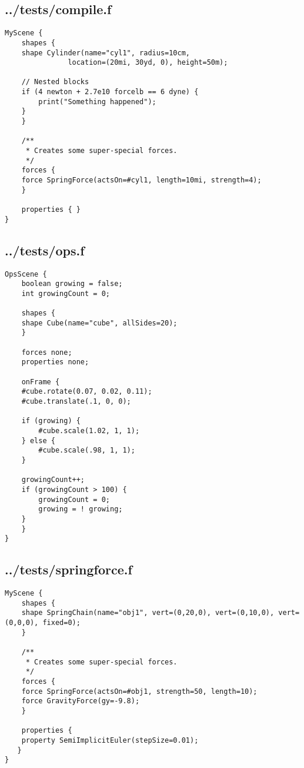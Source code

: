 \subsection*{../tests/compile.f}
\begin{lstlisting}
MyScene {
    shapes {
	shape Cylinder(name="cyl1", radius=10cm, 
		       location=(20mi, 30yd, 0), height=50m);

	// Nested blocks
	if (4 newton + 2.7e10 forcelb == 6 dyne) {
	    print("Something happened");
	}
    }

    /**
     * Creates some super-special forces.
     */
    forces {
	force SpringForce(actsOn=#cyl1, length=10mi, strength=4);
    }

    properties { }
}
\end{lstlisting}

\subsection*{../tests/ops.f}
\begin{lstlisting}
OpsScene {
    boolean growing = false;
    int growingCount = 0;

    shapes {
	shape Cube(name="cube", allSides=20);
    }

    forces none;
    properties none;

    onFrame {
	#cube.rotate(0.07, 0.02, 0.11);
	#cube.translate(.1, 0, 0);

	if (growing) {
	    #cube.scale(1.02, 1, 1);
	} else {
	    #cube.scale(.98, 1, 1);
	}

	growingCount++;
	if (growingCount > 100) {
	    growingCount = 0;
	    growing = ! growing;
	}
    }
}\end{lstlisting}

\subsection*{../tests/springforce.f}
\begin{lstlisting}
MyScene {
    shapes {
	shape SpringChain(name="obj1", vert=(0,20,0), vert=(0,10,0), vert=(0,0,0), fixed=0);
    }

    /**
     * Creates some super-special forces.
     */
    forces {
	force SpringForce(actsOn=#obj1, strength=50, length=10);
	force GravityForce(gy=-9.8);
    }

    properties { 
	property SemiImplicitEuler(stepSize=0.01);
   }
}
\end{lstlisting}

